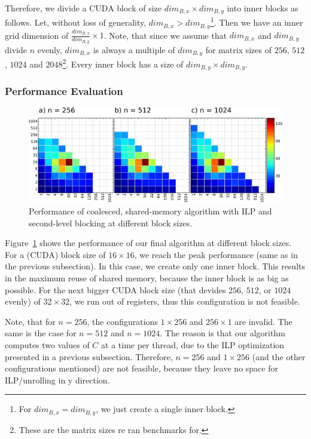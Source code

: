 \documentclass[12pt]{article}
\begin{document}
Therefore, we divide a CUDA block of size $\mathit{dim}_{B,x} \times \mathit{dim}_{B,y}$ into inner blocks as follows. Let, without loss of generality, $\mathit{dim}_{B,x} > \mathit{dim}_{B,y}$\footnote{For $\mathit{dim}_{B,x} = \mathit{dim}_{B,y}$, we just create a single inner block.}. Then we have an inner grid dimension of $\frac{\mathit{dim}_{B,x}}{\mathit{dim}_{B,y}} \times 1$. Note, that since we assume that $\mathit{dim}_{B,x}$ and $\mathit{dim}_{B,y}$ divide $n$ evenly, $\mathit{dim}_{B,x}$ is always a multiple of $\mathit{dim}_{B,y}$ for matrix sizes of $256$, $512$, $1024$ and $2048$\footnote{These are the matrix sizes re ran benchmarks for.}. Every inner block has a size of $\mathit{dim}_{B,y} \times \mathit{dim}_{B,y}$.

\subsubsection{Performance Evaluation}
\begin{figure}[H]
\centering
\includegraphics[width=\textwidth]{heat_final.pdf}
\caption{Performance of coalesced, shared-memory algorithm with ILP and second-level blocking at different block sizes.}
\label{fig:final_block_perf}
\end{figure}

Figure~\ref{fig:final_block_perf} shows the performance of our final algorithm at different block sizes. For a (CUDA) block size of $16 \times 16$, we reach the peak performance (same as in the previous subsection). In this case, we create only one inner block. This results in the maximum reuse of shared memory, because the inner block is as big as possible. For the next bigger CUDA block size (that devides $256$, $512$, or $1024$ evenly) of $32 \times 32$, we run out of registers, thus this configuration is not feasible.

Note, that for $n=256$, the configurations $1 \times 256$ and $256 \times 1$ are invalid. The same is the case for $n=512$ and $n=1024$. The reason is that our algorithm computes two values of $C$ at a time per thread, due to the ILP optimization presented in a previous subsection. Therefore, $n=256$ and $1 \times 256$ (and the other configurations mentioned) are not feasible, because they leave no space for ILP/unrolling in y direction.
\end{document}
